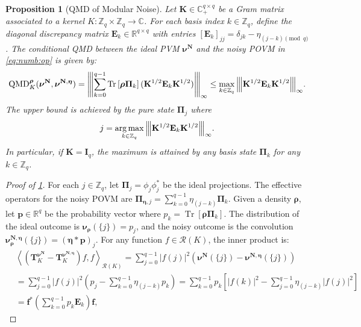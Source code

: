 \documentclass[noinfoline]{imsart}\setcounter{tocdepth}{2}
\renewcommand{\b}[1]{\mathbb{#1}} %
\newcommand{\m}[1]{\mathbf{#1}} %
\renewcommand{\c}[1]{\mathcal{#1}} %
\newcommand{\mb}[1]{\boldsymbol{#1}} %
\newcommand{\tr}[1]{\operatorname{Tr}\left[#1\right]}
\newcommand{\vertiii}[1]{{\left\vert\kern-0.25ex\left\vert\kern-0.25ex\left\vert #1 
    \right\vert\kern-0.25ex\right\vert\kern-0.25ex\right\vert}} %
\newcommand{\innpr}[2]{{\left\langle {#1},{#2}\right\rangle}} %
\newcommand{\QMD}{\operatorname{QMD}}
\DeclareMathOperator*{\argmax}{\arg\max}
\theoremstyle{plain}
\newtheorem{proposition}[theorem]{Proposition}
\begin{document}
\begin{appendix}
\begin{proposition}[QMD of Modular Noise]\label{QMD_modular_noise}
Let $\m{K} \in \b{C}_{+}^{q \times q}$ be a Gram matrix associated to a kernel $K: \b{Z}_q \times \b{Z}_{q} \to \b{C}$. For each basis index $k \in \b{Z}_{q}$, define the diagonal discrepancy matrix 
$\m{E}_{k} \in \b{R}^{q \times q}$ with entries $[\m{E}_{k}]_{jj} = \delta_{jk} - \eta_{(j-k) \pmod q} $.
The conditional QMD between the ideal PVM $\mb{\nu}^{\m{N}}$ and the noisy POVM in \eqref{eq:numb:op} is given by:
\begin{align*}
    \QMD_{K}^{\mb{\rho}}(\mb{\nu}^{\m{N}}, \mb{\nu}^{\m{N}, \mb{\eta}}) = 
    \vertiii{\sum_{k=0}^{q-1} \tr{\mb{\rho} \m{\Pi}_k} (\m{K}^{1/2} \m{E}_{k} \m{K}^{1/2})}_{\infty} \le \max_{k \in \b{Z}_{q}} \vertiii{\m{K}^{1/2} \m{E}_{k} \m{K}^{1/2}}_{\infty}.
\end{align*}
The upper bound is achieved by the pure state $\m{\Pi}_{j}$ where 
\begin{align*}
    j = \argmax\limits_{k \in \b{Z}_{q}} \vertiii{\m{K}^{1/2} \m{E}_{k} \m{K}^{1/2}}_{\infty}.
\end{align*}
In particular, if $\m{K} = \m{I}_{q}$, the maximum is attained by \emph{any} basis state $\m{\Pi}_{k}$ for any $k \in \b{Z}_{q}$.
\end{proposition}
\begin{proof}[Proof of \cref{QMD_modular_noise}]
For each $j \in \b{Z}_{q}$, let $\m{\Pi}_{j} = \phi_j \phi_j^*$ be the ideal projections. The effective operators for the noisy POVM are $\m{\Pi}_{\mb{\eta}, j} = \sum_{k=0}^{q-1} \eta_{(j-k)} \m{\Pi}_k$.
Given a density $\mb{\rho}$, let $\m{p} \in \b{R}^q$ be the probability vector where $p_k = \tr{\mb{\rho} \m{\Pi}_k}$. The distribution of the ideal outcome is $\mb{\nu}_{\mb{\rho}}(\{j\}) = p_j$, and the noisy outcome is the convolution $\mb{\nu}^{\m{N}, \mb{\eta}}_{\mb{\rho}}(\{j\}) = (\mb{\eta} \ast \m{p})_j$. For any function $f \in \c{R}(K)$, the inner product is:
\begin{align*}
    &\innpr{(\m{T}_{K}^{\mb{\nu}^{\m{N}}} - \m{T}_{K}^{\mb{\nu}^{\m{N}, \mb{\eta}}}) f}{f}_{\c{R}(K)} 
    = \sum_{j=0}^{q-1} |f(j)|^2 (\mb{\nu}^{\m{N}}(\{j\}) - \mb{\nu}^{\m{N}, \mb{\eta}}(\{j\})) \\
    &= \sum_{j=0}^{q-1} |f(j)|^2 \left( p_j - \sum_{k=0}^{q-1} \eta_{(j-k)} p_k \right) = \sum_{k=0}^{q-1} p_k \left[ |f(k)|^2 - \sum_{j=0}^{q-1} \eta_{(j-k)} |f(j)|^2 \right] \\ &= \m{f}^{*} \left(\sum_{k=0}^{q-1} p_k  \m{E}_{k} \right) \m{f},
\end{align*}

\end{proof}
\end{appendix}
\end{document}
